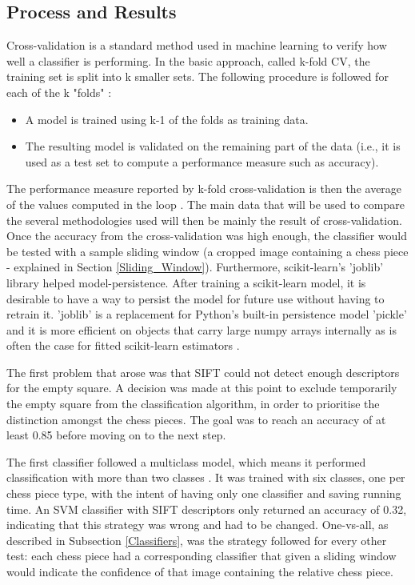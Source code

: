 \documentclass{l4proj}
\begin{document}
\subsection{Process and Results}

Cross-validation is a standard method used in machine learning to verify how well a classifier is performing. In the basic approach, called k-fold CV, the training set is split into k smaller sets. The following procedure is followed for each of the k "folds" \cite{CrossVal}:

\begin{itemize}

	\item A model is trained using k-1 of the folds as training data.
	\item The resulting model is validated on the remaining part of the data (i.e., it is used as a test set to compute a performance measure such as accuracy). 

\end{itemize}

The performance measure reported by k-fold cross-validation is then the average of the values computed in the loop \cite{CrossVal}. The main data that will be used to compare the several methodologies used will then be mainly the result of cross-validation. Once the accuracy from the cross-validation was high enough, the classifier would be tested with a sample sliding window (a cropped image containing a chess piece - explained in Section \ref{Sliding_Window}). Furthermore, scikit-learn's 'joblib' library helped model-persistence. After training a scikit-learn model, it is desirable to have a way to persist the model for future use without having to retrain it. 'joblib' is a replacement for Python's built-in persistence model 'pickle' and it is more efficient on objects that carry large numpy arrays internally as is often the case for fitted scikit-learn estimators \cite{ModelPersistence}.

The first problem that arose was that SIFT could not detect enough descriptors for the empty square. A decision was made at this point to exclude temporarily the empty square from the classification algorithm, in order to prioritise the distinction amongst the chess pieces. The goal was to reach an accuracy of at least 0.85 before moving on to the next step.

The first classifier followed a multiclass model, which means it performed classification with more than two classes \cite{MultiClass}. It was trained with six classes, one per chess piece type, with the intent of having only one classifier and saving running time. An SVM classifier with SIFT descriptors only returned an accuracy of 0.32, indicating that this strategy was wrong and had to be changed. One-vs-all, as described in Subsection \ref{Classifiers}, was the strategy followed for every other test: each chess piece had a corresponding classifier that given a sliding window would indicate the confidence of that image containing the relative chess piece.
\end{document}
